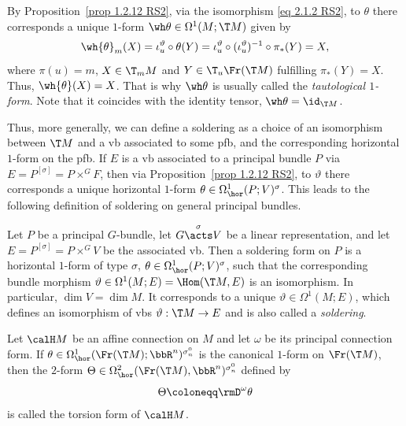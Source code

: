 \begin{rem}
    By Proposition~\ref{prop 1.2.12 RS2}, via the isomorphism \eqref{eq 2.1.2 RS2}, to $\theta$ there corresponds a unique $1$-form $\wh\theta\in\Omega^1(M;\T M)$ given by
    \[\wh{\theta}_m(X)=\iota_u^\vartheta\circ \theta(Y)=\iota_u^\vartheta\circ (\iota_u^\vartheta)^{-1}\circ\pi_\ast(Y)=X,\]
    where $\pi(u)=m$, $X\in \T_mM$ and $Y\in \T_u\Fr(\T M)$ fulfilling $\pi_\ast(Y)=X$. Thus, $\wh{\theta}(X)=X$. That is why $\wh\theta$ is usually called the \emph{tautological $1$-form}. Note that it coincides with the identity tensor, $\wh\theta=\id_{\T M}$.
\end{rem}

Thus, more generally, we can define a soldering as a choice of an isomorphism between $\T M$ and a \gls{vb} associated to some \gls{pfb}, and the corresponding horizontal $1$-form on the \gls{pfb}. If $E$ is a \gls{vb} associated to a principal bundle $P$ via $E=P^{[\sigma]}=P\times^G F$, then via Proposition~\ref{prop 1.2.12 RS2}, to $\vartheta$ there corresponds a unique horizontal $1$-form $\theta\in\Omega^1_{\hor}(P;V)^\sigma$. This leads to the following definition of soldering on general principal bundles.

\begin{defn}\label{def soldering on pfb}
    Let $P$ be a principal $G$-bundle, let $G\overset{\sigma}{\acts}V$ be a linear representation, and let $E=P^{[\sigma]}=P\times^G V$ be the associated \gls{vb}. Then a soldering form on $P$ is a horizontal $1$-form of type $\sigma$, $\theta\in\Omega^1_{\hor}(P;V)^\sigma$, such that the corresponding bundle morphism $\vartheta\in \Omega^1(M;E)=\Hom(\T M,E)$ is an isomorphism. In particular, $\dim V=\dim M$. It corresponds to a unique $\vartheta\in\Omega^1(M; E)$, which defines an isomorphism of \glspl{vb} $\vartheta:\T M\to E$ and is also called a \emph{soldering}.
\end{defn}


\begin{defn}
    Let $\calH M$ be an affine connection on $M$ and let $\omega$ be its principal connection form. If $\theta\in\Omega^1_{\hor}(\Fr(\T M);\bbR^n)^{\sigma_n^0}$ is the canonical $1$-form on $\Fr(\T M)$, then the $2$-form $\Theta\in\Omega^2_{\hor}(\Fr(\T M),\bbR^n)^{\sigma_n^0}$ defined by
    \[\Theta\coloneqq \rmD^\omega\theta\label{eq 2.1.10 RS2}\]
    is called the torsion form of $\calH M$.
\end{defn}

